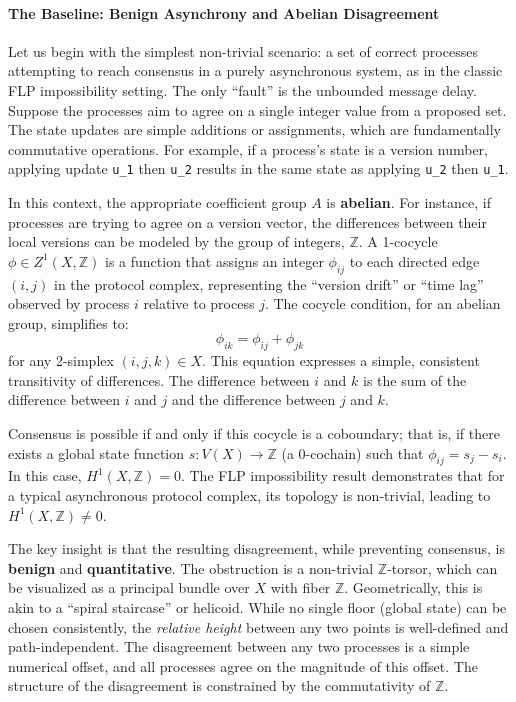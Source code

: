 \documentclass[
]{article}
\begin{document}
\paragraph{The Baseline: Benign Asynchrony and Abelian
Disagreement}\label{the-baseline-benign-asynchrony-and-abelian-disagreement}

Let us begin with the simplest non-trivial scenario: a set of correct
processes attempting to reach consensus in a purely asynchronous system,
as in the classic FLP impossibility setting. The only ``fault'' is the
unbounded message delay. Suppose the processes aim to agree on a single
integer value from a proposed set. The state updates are simple
additions or assignments, which are fundamentally commutative
operations. For example, if a process's state is a version number,
applying update \texttt{u\_1} then \texttt{u\_2} results in the same
state as applying \texttt{u\_2} then \texttt{u\_1}.

In this context, the appropriate coefficient group \(A\) is
\textbf{abelian}. For instance, if processes are trying to agree on a
version vector, the differences between their local versions can be
modeled by the group of integers, \(\mathbb{Z}\). A 1-cocycle
\(\phi \in Z^1(X, \mathbb{Z})\) is a function that assigns an integer
\(\phi_{ij}\) to each directed edge \((i, j)\) in the protocol complex,
representing the ``version drift'' or ``time lag'' observed by process
\(i\) relative to process \(j\). The cocycle condition, for an abelian
group, simplifies to: \[ \phi_{ik} = \phi_{ij} + \phi_{jk} \] for any
2-simplex \((i, j, k) \in X\). This equation expresses a simple,
consistent transitivity of differences. The difference between \(i\) and
\(k\) is the sum of the difference between \(i\) and \(j\) and the
difference between \(j\) and \(k\).

Consensus is possible if and only if this cocycle is a coboundary; that
is, if there exists a global state function \(s: V(X) \to \mathbb{Z}\)
(a 0-cochain) such that \(\phi_{ij} = s_j - s_i\). In this case,
\(H^1(X, \mathbb{Z}) = 0\). The FLP impossibility result demonstrates
that for a typical asynchronous protocol complex, its topology is
non-trivial, leading to \(H^1(X, \mathbb{Z}) \neq 0\).

The key insight is that the resulting disagreement, while preventing
consensus, is \textbf{benign} and \textbf{quantitative}. The obstruction
is a non-trivial \(\mathbb{Z}\)-torsor, which can be visualized as a
principal bundle over \(X\) with fiber \(\mathbb{Z}\). Geometrically,
this is akin to a ``spiral staircase'' or helicoid. While no single
floor (global state) can be chosen consistently, the \emph{relative
height} between any two points is well-defined and path-independent. The
disagreement between any two processes is a simple numerical offset, and
all processes agree on the magnitude of this offset. The structure of
the disagreement is constrained by the commutativity of \(\mathbb{Z}\).
\end{document}
